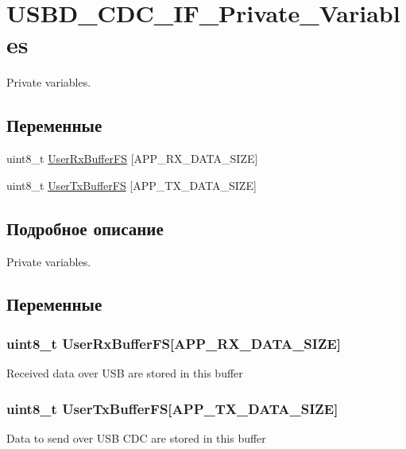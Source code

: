 \hypertarget{group___u_s_b_d___c_d_c___i_f___private___variables}{
\section{USBD\_\-CDC\_\-IF\_\-Private\_\-Variables}
\label{group___u_s_b_d___c_d_c___i_f___private___variables}
}
Private variables.  


\subsection*{Переменные}
\begin{CompactItemize}
\item 
uint8\_\-t \hyperlink{group___u_s_b_d___c_d_c___i_f___private___variables_g1e37e6616e6affe5acf9c0befd063f6a}{UserRxBufferFS} \mbox{[}APP\_\-RX\_\-DATA\_\-SIZE\mbox{]}
\item 
uint8\_\-t \hyperlink{group___u_s_b_d___c_d_c___i_f___private___variables_gd48fea85cdb7aed49bf62140a52f23e0}{UserTxBufferFS} \mbox{[}APP\_\-TX\_\-DATA\_\-SIZE\mbox{]}
\end{CompactItemize}


\subsection{Подробное описание}
Private variables. 

\subsection{Переменные}
\hypertarget{group___u_s_b_d___c_d_c___i_f___private___variables_g1e37e6616e6affe5acf9c0befd063f6a}{
\subsubsection[{UserRxBufferFS}]{\setlength{\rightskip}{0pt plus 5cm}uint8\_\-t {\bf UserRxBufferFS}\mbox{[}APP\_\-RX\_\-DATA\_\-SIZE\mbox{]}}}
\label{group___u_s_b_d___c_d_c___i_f___private___variables_g1e37e6616e6affe5acf9c0befd063f6a}


Received data over USB are stored in this buffer \hypertarget{group___u_s_b_d___c_d_c___i_f___private___variables_gd48fea85cdb7aed49bf62140a52f23e0}{
\subsubsection[{UserTxBufferFS}]{\setlength{\rightskip}{0pt plus 5cm}uint8\_\-t {\bf UserTxBufferFS}\mbox{[}APP\_\-TX\_\-DATA\_\-SIZE\mbox{]}}}
\label{group___u_s_b_d___c_d_c___i_f___private___variables_gd48fea85cdb7aed49bf62140a52f23e0}


Data to send over USB CDC are stored in this buffer 